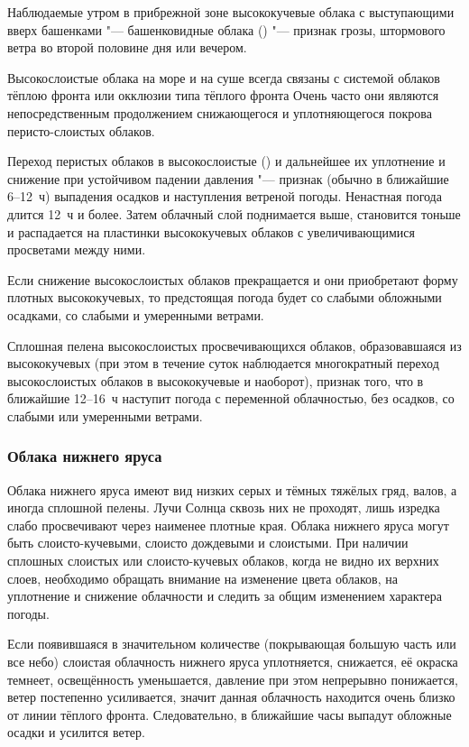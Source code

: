  Наблюдаемые утром в прибрежной зоне высококучевые облака с
выступающими вверх башенками "--- башенковидные облака () "--- признак
грозы, штормового ветра во второй половине дня или вечером.

Высокослоистые облака на море и на суше всегда связаны с системой
облаков тёплою фронта или окклюзии типа тёплого фронта Очень часто они
являются непосредственным продолжением снижающегося и уплотняющегося
покрова перисто-слоистых облаков.

 Переход перистых облаков в высокослоистые () и
дальнейшее их уплотнение и снижение при устойчивом падении
давления "--- признак (обычно в ближайшие 6--12~ч) выпадения
осадков и наступления ветреной погоды. Ненастная погода длится 12~ч и
более. Затем облачный слой поднимается выше, становится тоньше и
распадается на пластинки высококучевых облаков с увеличивающимися
просветами между ними.

 Если снижение высокослоистых облаков прекращается и они
приобретают форму плотных высококучевых, то предстоящая погода будет
со слабыми обложными осадками, со слабыми и умеренными ветрами.

 Сплошная пелена высокослоистых просвечивающихся облаков,
образовавшаяся из высококучевых (при этом в течение суток наблюдается
многократный переход высокослоистых облаков в высококучевые и
наоборот), признак того, что в ближайшие 12--16~ч наступит погода
с переменной облачностью, без осадков, со слабыми или умеренными
ветрами.

\subsubsection{Облака нижнего яруса}

Облака нижнего яруса имеют вид низких серых и тёмных тяжёлых гряд,
валов, а иногда сплошной пелены. Лучи Солнца сквозь них не проходят,
лишь изредка слабо просвечивают через наименее плотные края. Облака
нижнего яруса могут быть слоисто-кучевыми, слоисто дождевыми и
слоистыми. При наличии сплошных слоистых или слоисто-кучевых облаков,
когда не видно их верхних слоев, необходимо обращать внимание на
изменение цвета облаков, на уплотнение и снижение облачности и следить
за общим изменением характера погоды.

 Если появившаяся в значительном количестве (покрывающая большую
часть или все небо) слоистая облачность нижнего яруса уплотняется,
снижается, её окраска темнеет, освещённость уменьшается, давление при
этом непрерывно понижается, ветер постепенно усиливается, значит
данная облачность находится очень близко от линии тёплого
фронта. Следовательно, в ближайшие часы выпадут обложные осадки и
усилится ветер.

